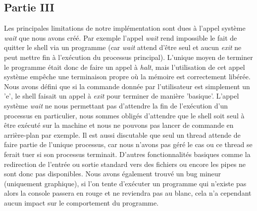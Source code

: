 \documentclass{article}
\begin{document}
\subsection{Partie III}
Les principales limitations de notre implémentation sont dues à l'appel système \textit{wait} que nous avons créé. Par exemple l'appel 
\textit{wait} rend impossible le fait de quitter le shell via un programme (car \textit{wait} attend d'être seul et aucun \textit{exit} 
ne peut mettre fin à l'exécution du processus principal). L'unique moyen de terminer le programme était donc de faire un appel à \textit{halt},
mais l'utilisation de cet appel système empêche une terminaison propre où la mémoire est correctement libérée. Nous avons défini que si la commande
donnée par l'utilisateur est simplement un 'e', le shell faisait un appel à \textit{exit} pour terminer de manière 'basique'. L'appel système \textit{wait}
ne nous permettant pas d'attendre la fin de l'exécution d'un processus en particulier, nous sommes obligés d'attendre que le shell soit seul à être exécuté
sur la machine et nous ne pouvons pas lancer de commande en arrière-plan par exemple. Il est aussi discutable que seul un thread attende de faire partie de l'unique
processus, car nous n'avons pas géré le cas ou ce thread se ferait tuer si son processus terminait. D'autres fonctionnalités basiques comme la redirection de l'entrée ou 
sortie standard vers des fichiers ou encore les pipes ne sont donc pas disponibles. Nous avons également trouvé un bug mineur (uniquement graphique), si l'on tente d'exécuter
un programme qui n'existe pas alors la console passera en rouge et ne reviendra pas au blanc, cela n'a cependant aucun impact sur le comportement du programme.
\end{document}
